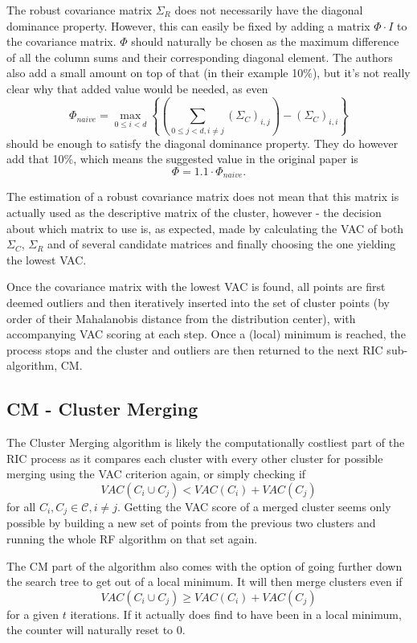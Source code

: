 \documentclass[conference]{IEEEtran}
\begin{document}
The robust covariance matrix $ \Sigma_R $ does not necessarily have the diagonal dominance property. However, this can easily be fixed by adding a matrix $ \varPhi \cdot I $ to the covariance matrix. $ \varPhi $ should naturally be chosen as the maximum difference of all the column sums and their corresponding diagonal element. The authors also add a small amount on top of that (in their example 10\%), but it's not really clear why that added value would be needed, as even
\[ \varPhi_{naive} = \max_{0 \leq i < d} \left\{ \left( \sum_{0 \leq j < d, i\neq j} (\Sigma_C)_{i,j} \right) - (\Sigma_{C})_{i,i} \right\} \]
should be enough to satisfy the diagonal dominance property. They do however add that 10\%, which means the suggested value in the original paper is
\[  \varPhi = 1.1 \cdot \varPhi_{naive}. \]

The estimation of a robust covariance matrix does not mean that this matrix is actually used as the descriptive matrix of the cluster, however - the decision about which matrix to use is, as expected, made by calculating the VAC of both $ \Sigma_C $, $\Sigma_R $ and of several candidate matrices and finally choosing the one yielding the lowest VAC.

Once the covariance matrix with the lowest VAC is found, all points are first deemed outliers and then iteratively inserted into the set of cluster points (by order of their Mahalanobis distance from the distribution center), with accompanying VAC scoring at each step. Once a (local) minimum is reached, the process stops and the cluster and outliers are then returned to the next RIC sub-algorithm, CM.

\subsection{CM - Cluster Merging}
The Cluster Merging algorithm is likely the computationally costliest part of the RIC process as it compares each cluster with every other cluster for possible merging using the VAC criterion again, or simply checking if
\[ VAC(C_i \cup C_j) < VAC(C_i) + VAC(C_j) \]
for all $ C_i,C_j \in \mathcal{C},i \neq j $. Getting the VAC score of a merged cluster seems only possible by building a new set of points from the previous two clusters and running the whole RF algorithm on that set again.

The CM part of the algorithm also comes with the option of going further down the search tree to get out of a local minimum. It will then merge clusters even if
\[ VAC(C_i \cup C_j) \geq VAC(C_i) + VAC(C_j) \]
for a given $ t $ iterations. If it actually does find to have been in a local minimum, the counter will naturally reset to 0.
\end{document}

